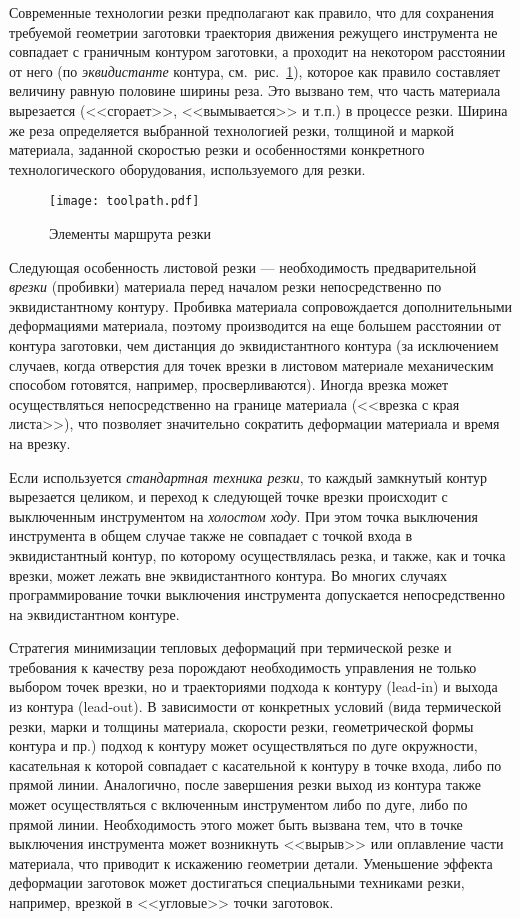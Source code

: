 Современные технологии резки предполагают как правило,
что для сохранения требуемой геометрии заготовки
траектория движения режущего инструмента не совпадает с
граничным контуром заготовки,
а проходит на некотором расстоянии от него
(по \textit{эквидистанте} контура,
см.~рис.~\ref{fig:toolpath}),
которое как правило составляет величину
равную половине ширины реза.
Это вызвано тем, что
часть материала вырезается
(<<сгорает>>, <<вымывается>> и т.п.)
в процессе резки.
Ширина же реза определяется
выбранной технологией резки,
толщиной и маркой материала,
заданной скоростью резки и
особенностями конкретного технологического оборудования,
используемого для резки.

\begin{figure}
  \centering
  \texttt{[image: toolpath.pdf]}
  \caption{Элементы маршрута резки}
  \label{fig:toolpath}
\end{figure}

Следующая особенность листовой резки ---
необходимость предварительной \textit{врезки}
(пробивки) материала перед началом резки непосредственно по
эквидистантному контуру.
Пробивка материала сопровождается дополнительными деформациями материала,
поэтому производится на еще большем расстоянии от контура заготовки, чем
дистанция до эквидистантного контура
(за исключением случаев,
когда отверстия для точек врезки в листовом материале механическим способом готовятся,
например, просверливаются).
Иногда врезка может осуществляться непосредственно на границе материала
(<<врезка с края листа>>),
что позволяет значительно сократить
деформации материала и время на врезку.

Если используется
\textit{стандартная техника резки},
то каждый замкнутый контур вырезается целиком,
и  переход к следующей точке врезки происходит
с выключенным инструментом на \textit{холостом ходу}.
При этом точка выключения инструмента в общем
случае также не совпадает с точкой входа в эквидистантный контур,
по которому осуществлялась резка, и также, как и точка врезки, может
лежать вне эквидистантного контура.
Во многих случаях программирование точки выключения инструмента
допускается непосредственно на эквидистантном контуре.

Стратегия минимизации тепловых деформаций при термической резке
и требования к качеству реза порождают необходимость управления не
только выбором точек врезки,
но и  траекториями подхода к контуру
(lead-in)
и выхода из контура
(lead-out).
В зависимости от
конкретных условий
(вида термической резки, марки и толщины материала,
скорости резки, геометрической формы контура и пр.)
подход к контуру может осуществляться по дуге окружности,
касательная к которой совпадает с касательной к контуру в точке входа,
либо по прямой линии.
Аналогично,
после завершения резки выход из контура также может осуществляться с
включенным инструментом
либо по дуге, либо по прямой линии.
Необходимость этого может быть вызвана
тем, что в точке выключения инструмента может возникнуть <<вырыв>> или
оплавление части материала,
что приводит к искажению геометрии детали.
Уменьшение эффекта деформации заготовок
может достигаться специальными техниками резки,
например,
врезкой
в <<угловые>> точки заготовок.


